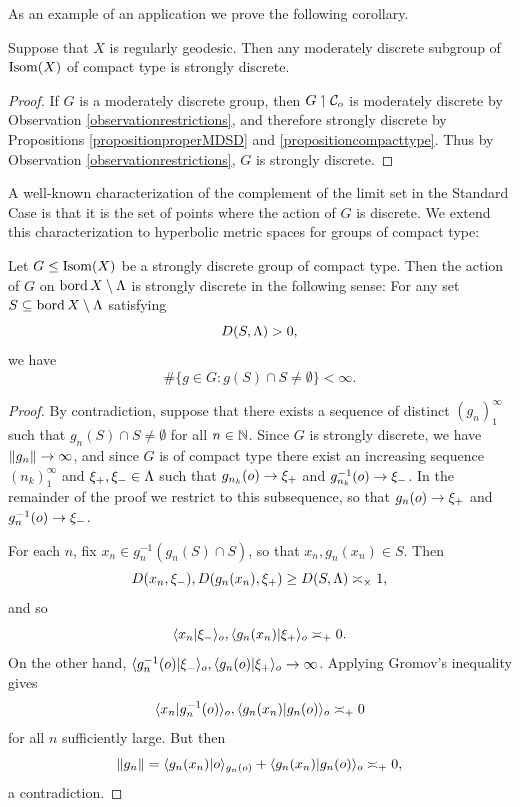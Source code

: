 As an example of an application we prove the following corollary.
\begin{corollary}
Suppose that $X$ is regularly geodesic. Then any moderately discrete subgroup of $\operatorname{Isom}(X)$ of compact type is strongly discrete.
\end{corollary}
\begin{proof}
If $G$ is a moderately discrete group, then $G\upharpoonleft\mathcal C_o$ is moderately discrete by Observation \ref{observationrestrictions}, and therefore strongly discrete by Propositions \ref{propositionproperMDSD} and \ref{propositioncompacttype}. Thus by Observation \ref{observationrestrictions}, $G$ is strongly discrete.
\end{proof}


A well-known characterization of the complement of the limit set in the Standard Case is that it is the set of points where the action of $G$ is discrete. We extend this characterization to hyperbolic metric spaces for groups of compact type:


\begin{proposition}
\label{propositionSDonclX}
Let $G\leq\operatorname{Isom}(X)$ be a strongly discrete group of compact type. Then the action of $G$ on $\operatorname{bord} X\setminus\Lambda$ is strongly discrete in the following sense: For any set $S\subseteq\operatorname{bord} X\setminus\Lambda$ satisfying
\begin{equation}
\label{Lambdabounded}
D(S,\Lambda) > 0,
\end{equation}
we have
\[
\#\{g\in G : g(S)\cap S \neq \emptyset\} < \infty.
\]
\end{proposition}
\begin{proof}
By contradiction, suppose that there exists a sequence of distinct $(g_n)_1^\infty$ such that $g_n(S)\cap S\neq \emptyset$ for all $n\in\N$. Since $G$ is strongly discrete, we have $\|g_n\|\to\infty$, and since $G$ is of compact type there exist an increasing sequence $(n_k)_1^\infty$ and $\xi_+,\xi_-\in\Lambda$ such that $g_{n_k}(o)\to \xi_+$ and $g_{n_k}^{-1}(o)\to\xi_-$. In the remainder of the proof we restrict to this subsequence, so that $g_n(o)\to \xi_+$ and $g_n^{-1}(o)\to\xi_-$.

For each $n$, fix $x_n\in g_n^{-1}(g_n(S)\cap S)$, so that $x_n,g_n(x_n)\in S$. Then
\[
D(x_n,\xi_-), D(g_n(x_n),\xi_+) \geq D(S,\Lambda) \asymp_\times 1,
\]
and so
\[
\langle x_n|\xi_-\rangle_o , \langle g_n(x_n)|\xi_+ \rangle_o \asymp_+ 0.
\]
On the other hand, $\langle g_n^{-1}(o)|\xi_-\rangle_o, \langle g_n(o)|\xi_+\rangle_o \to \infty$. Applying Gromov's inequality gives
\[
\langle x_n|g_n^{-1}(o)\rangle_o , \langle g_n(x_n)|g_n(o) \rangle_o \asymp_+ 0
\]
for all $n$ sufficiently large. But then
\[
\|g_n\| = \langle g_n(x_n)|o\rangle_{g_n(o)} + \langle g_n(x_n)|g_n(o) \rangle_o \asymp_+ 0,
\]
a contradiction.
\end{proof}

\endinput